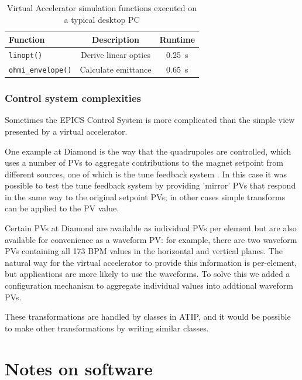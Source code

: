 \documentclass[a4paper,
               keeplastbox,   %
               ]{jacow}
\begin{document}
\begin{table}[!hbt]
   \centering
   \caption{Virtual Accelerator simulation functions executed on a typical desktop PC}
   \begin{tabular}{lcc}
       \toprule
       \textbf{Function} & \textbf{Description}                      & \textbf{Runtime} \\
       \midrule
           \texttt{linopt()}         & Derive linear optics            & \SI{0.25}{s}        \\
           \texttt{ohmi\_envelope()}  & Calculate emittance      & \SI{0.65}{s}        \\
       \bottomrule
   \end{tabular}
   \label{simfunctions}
\end{table}

\subsubsection{Control system complexities}

Sometimes the EPICS Control System is more complicated than the simple view presented
by a virtual accelerator.

One example at Diamond is the way that the quadrupoles are 
controlled, which uses a number of PVs to aggregate contributions to the magnet
setpoint from different sources, one of which is the tune feedback system \cite{feedbacks}.
In this case it was possible to test the tune feedback system by providing 'mirror'
PVs that respond in the same way to the original setpoint PVs; in other cases
simple transforms can be applied to the PV value.

Certain PVs at Diamond are available as individual PVs per element but are also
available for convenience as a waveform PV: for example, there are two waveform
PVs containing all 173 BPM values in the horizontal and vertical planes. The natural
way for the virtual accelerator to provide this information is per-element, but
applications are more likely to use the waveforms. To solve this we added a
configuration mechanism to aggregate individual values into addtional waveform PVs.

These transformations are handled by classes in ATIP, and it would be possible to
make other transformations by writing similar classes.

\section{Notes on software}
\end{document}
